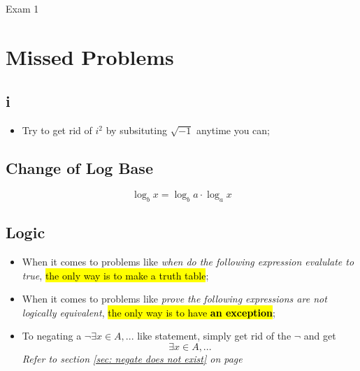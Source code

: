 \documentclass{note}
\begin{document}
\begin{note}{Exam 1}
        \newpage
        \appendix
        \section{Missed Problems}

        \subsection{i}

        \begin{itemize}
            \item Try to get rid of $ i^{2} $ by subsituting $ \sqrt{- 1} $ anytime you can;
        \end{itemize}

        \subsection{Change of Log Base}

        \begin{displaymath}
            \log_{b}x = \log_{b}a \cdot \log_{a} x
        \end{displaymath}

        \subsection{Logic}

        \begin{itemize}
            \item When it comes to problems like \textit{when do the following expression evalulate to true}, \hl{the only way
            is to make a truth table};

            \item When it comes to problems like \textit{prove the following expressions are not logically equivalent}, \hl{the only way
            is to have \textbf{an exception}};

            \item To negating a $ \neg \exists x \in A, ... $ like statement, simply get rid of the $ \neg $ and get 
            \begin{displaymath}
                \exists x \in A, ...
            \end{displaymath} 
            \textit{Refer to section \ref{sec: negate does not exist} on page \pageref{sec: negate does not exist}}
        \end{itemize}

    \end{note}
\end{document}
